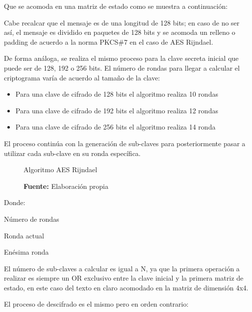 \documentclass[../main/main.tex]{subfiles}
\begin{document}
  Que se acomoda en una matriz de estado como se muestra a continuación:

  \begin{table}[H]
    \centering
    
  \end{table}

  Cabe recalcar que el mensaje es de una longitud de 128 bits; en caso de no ser así, el mensaje es dividido en paquetes de 128 bits y se acomoda un relleno o padding de acuerdo a la norma PKCS\#7 en el caso de AES Rijndael.

  De forma análoga, se realiza el mismo proceso para la clave secreta inicial que puede ser de 128, 192 o 256 bits. El número de rondas para llegar a calcular el criptograma varía de acuerdo al tamaño de la clave:

  \begin{itemize}[noitemsep,nolistsep]
    \item Para una clave de cifrado de 128 bits el algoritmo realiza 10 rondas
    \item Para una clave de cifrado de 192 bits el algoritmo realiza 12 rondas
    \item Para una clave de cifrado de 256 bits el algoritmo realiza 14 ronda
  \end{itemize}
  
  El proceso continúa con la generación de sub-claves para posteriormente pasar a utilizar cada sub-clave en su ronda específica.

  \begin{figure}[H]
    \centering
    \caption{Algoritmo AES Rijndael}
    
    \caption*{\textbf{Fuente:} Elaboración propia}
  \end{figure}

  Donde:

  \begin{description}
    \item[N:] Número de rondas
    \item[i:] Ronda actual
    \item[$N_a$:] Enésima ronda
  \end{description}

  El número de sub-claves a calcular es igual a N, ya que la primera operación a realizar es siempre un OR exclusivo entre la clave inicial y la primera matriz de estado, en este caso del texto en claro acomodado en la matriz de dimensión 4x4.
  
  El proceso de descifrado es el mismo pero en orden contrario:
\end{document}
